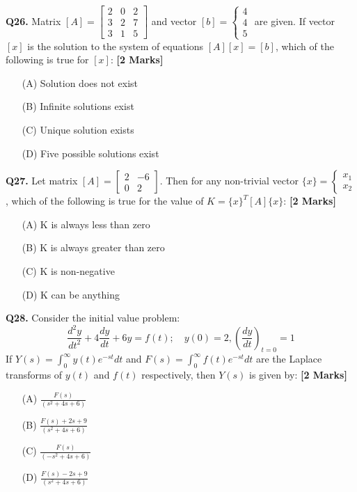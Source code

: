 \documentclass[11pt]{article}
\newcommand{\questionb}[2]{
    \noindent\textbf{Q#2.} #1 \hfill \textbf{[2 Marks]}
}
\begin{document}
\vspace{0.5cm}

\questionb{Matrix $[A] = 
\begin{bmatrix}
2 & 0 & 2 \\
3 & 2 & 7 \\ 
3 & 1 & 5
\end{bmatrix}$ and vector $[b] = 
\begin{cases}
4 \\
4 \\
5
\end{cases}$ are given. If vector $[x]$ is the solution to the system of equations $[A][x] = [b]$, which of the following is true for $[x]$:}{26}
\begin{enumerate}
    \item[(A)] Solution does not exist
    \item[(B)] Infinite solutions exist
    \item[(C)] Unique solution exists
    \item[(D)] Five possible solutions exist
\end{enumerate}

\vspace{0.5cm}

\questionb{Let matrix $[A] = \begin{bmatrix} 2 & -6 \\ 0 & 2 \end{bmatrix}$. Then for any non-trivial vector $\{x\} = \begin{cases} x_1 \\ x_2 \end{cases}$, which of the following is true for the value of $K = \{x\}^T[A]\{x\}$:}{27}
\begin{enumerate}
    \item[(A)] K is always less than zero
    \item[(B)] K is always greater than zero
    \item[(C)] K is non-negative
    \item[(D)] K can be anything
\end{enumerate}

\vspace{0.5cm}

\questionb{Consider the initial value problem:
\[
\frac{d^2 y}{dt^2} + 4 \frac{dy}{dt} + 6y = f(t); \quad y(0) = 2, \left( \frac{dy}{dt} \right)_{t=0} = 1
\]
If $Y(s) = \int_0^\infty y(t)e^{-st} dt$ and $F(s) = \int_0^\infty f(t)e^{-st} dt$ are the Laplace transforms of $y(t)$ and $f(t)$ respectively, then $Y(s)$ is given by:}{28}
\begin{enumerate}
    \item[(A)] $\frac{F(s)}{(s^2+4s+6)}$
    \item[(B)] $\frac{F(s)+2s+9}{(s^2+4s+6)}$
    \item[(C)] $\frac{F(s)}{(-s^2+4s+6)}$
    \item[(D)] $\frac{F(s)-2s+9}{(s^2+4s+6)}$
\end{enumerate}
\end{document}
